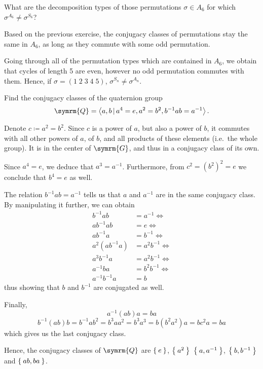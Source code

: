 \begin{exercise}
What are the decomposition types of those permutations \(\sigma \in A_6\) for which \(\sigma^{A_6} \neq \sigma^{S_6}\)?
\end{exercise}
\begin{solution}
Based on the previous exercise, the conjugacy classes of permutations stay the same in \(A_6\), as long as they commute with some odd permutation.

Going through all of the permutation types which are contained in \(A_6\), we obtain that cycles of length 5 are even, however no odd permutation commutes with them. Hence, if \(\sigma = (1 \; 2 \; 3 \; 4 \; 5)\), \(\sigma^{S_n} \neq \sigma^{A_n}\).
\end{solution}

\begin{exercise}
Find the conjugacy classes of the quaternion group
\[
    \symrm{Q} = \generatedby{a, b \vbar a^4 = e, a^2 = b^2, b^{-1} a b = a^{-1}}.
\]
\end{exercise}
\begin{solution}
Denote \(c \coloneqq a^2 = b^2\). Since \(c\) is a power of \(a\), but also a power of \(b\), it commutes with all other powers of \(a\), of \(b\), and all products of these elements (i.e.\ the whole group). It is in the center of \(\symrm{G}\), and thus in a conjugacy class of its own.

Since \(a^4 = e\), we deduce that \(a^3 = a^{-1}\). Furthermore, from \(c^2 = (b^2)^2 = e\) we conclude that \(b^4 = e\) as well.

The relation \(b^{-1} a b = a^{-1}\) tells us that \(a\) and \(a^{-1}\) are in the same conjugacy class. By manipulating it further, we can obtain
\begin{align*}
    b^{-1} a b &= a^{-1} \iff \\
    a b^{-1} a b &= e  \iff \\
    a b^{-1} a &= b^{-1} \iff \\
    a^2 (a b^{-1} a) &= a^2 b^{-1} \iff \\
    a^3 b^{-1} a &= a^2 b^{-1} \iff \\
    a^{-1} b a &= b^2 b^{-1} \iff \\
    a^{-1} b^{-1} a &= b
\end{align*}
thus showing that \(b\) and \(b^{-1}\) are conjugated as well.

Finally,
\[
    a^{-1} (ab) a = ba
\]
\[  
b^{-1} (ab) b = b^{-1} a b^2 = b^3 a a^2 = b^3 a^3 = b (b^2 a^2) a = b c^2 a = b a
\]
which gives us the last conjugacy class.

Hence, the conjugacy classes of \(\symrm{Q}\) are \(\Set{e}\), \(\Set{a^2}\) \(\Set{a, a^{-1}}\), \(\Set{b, b^{-1}}\) and \(\Set{ab, b a}\).
\end{solution}